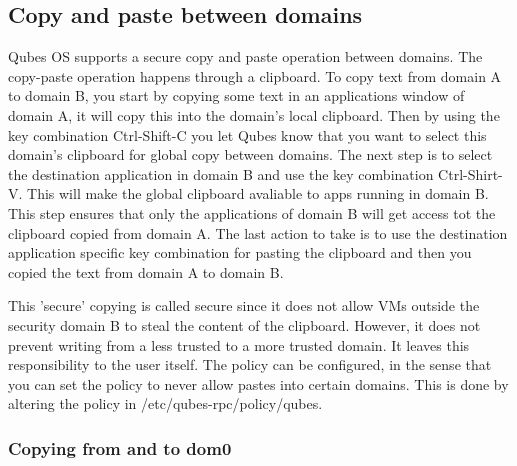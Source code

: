\documentclass[runningheads,a4paper]{article}
\begin{document}
\subsection{Copy and paste between domains} 

Qubes OS supports a secure
copy and paste operation between domains.  The copy-paste operation
happens through a clipboard.  To copy text from domain A to domain B,
you start by copying some text in an applications window of domain A,
it will copy this into the domain's local clipboard.  Then by using
the key combination Ctrl-Shift-C you let Qubes know that you want to
select this domain's clipboard for global copy between domains.  The
next step is to select the destination application in domain B and use
the key combination Ctrl-Shirt-V.  This will make the global clipboard
avaliable to apps running in domain B.  This step ensures that only
the applications of domain B will get access tot the clipboard copied
from domain A.  The last action to take is to use the destination
application specific key combination for pasting the clipboard and
then you copied the text from domain A to domain B.

 This 'secure' copying is called secure since it does not allow VMs
outside the security domain B to steal the content of the clipboard.
However, it does not prevent writing from a less trusted to a more
trusted domain.  It leaves this responsibility to the user itself.
The policy can be configured, in the sense that you can set the policy
to never allow pastes into certain domains.  This is done by altering
the policy in /etc/qubes-rpc/policy/qubes. 

\subsubsection{Copying from and to dom0} 

\end{document}
